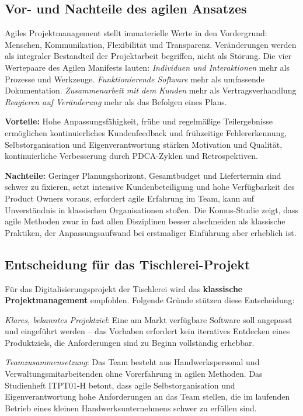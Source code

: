 \documentclass[
    a4paper,
    11pt,
    bibliography=totoc,
    listof=totoc,
    parskip=half,
    headings=normal
]{scrbook}
\begin{document}
\subsection{Vor- und Nachteile des agilen Ansatzes}

Agiles Projektmanagement stellt immaterielle Werte in den Vordergrund: Menschen,
Kommunikation, Flexibilität und Transparenz. Veränderungen werden als integraler
Bestandteil der Projektarbeit begriffen, nicht als Störung\autocite[vgl.][Kap.~1]{Reppin2020}. Die vier Wertepaare des Agilen Manifests lauten:
\textit{Individuen und Interaktionen} mehr als Prozesse und Werkzeuge.
\textit{Funktionierende Software} mehr als umfassende Dokumentation.
\textit{Zusammenarbeit mit dem Kunden} mehr als Vertragsverhandlung
\textit{Reagieren auf Veränderung} mehr als das Befolgen eines Plans\autocite[vgl.][]{BeckEtAl2001a}.

\textbf{Vorteile:} Hohe Anpassungsfähigkeit, frühe und regelmäßige Teilergebnisse
ermöglichen kontinuierliches Kundenfeedback und frühzeitige Fehlererkennung,
Selbstorganisation und Eigenverantwortung stärken Motivation und Qualität,
kontinuierliche Verbesserung durch PDCA-Zyklen und Retrospektiven\autocite[vgl.][Kap.~1]{Reppin2020}.

\textbf{Nachteile:} Geringer Planungshorizont, Gesamtbudget und Liefertermin sind
schwer zu fixieren, setzt intensive Kundenbeteiligung und hohe Verfügbarkeit
des Product Owners voraus, erfordert agile Erfahrung im Team, kann auf
Unverständnis in klassischen Organisationen stoßen\autocite[vgl.][Kap.~1]{Reppin2020}. Die Komus-Studie zeigt, dass agile Methoden
zwar in fast allen Disziplinen besser abschneiden als klassische Praktiken, der
Anpassungsaufwand bei erstmaliger Einführung aber erheblich ist\autocite[vgl.][]{Komus2015}.

\subsection{Entscheidung für das Tischlerei-Projekt}

Für das Digitalisierungsprojekt der Tischlerei wird das \textbf{klassische
      Projektmanagement} empfohlen. Folgende Gründe stützen diese Entscheidung:

\textit{Klares, bekanntes Projektziel}: Eine am Markt verfügbare Software soll
angepasst und eingeführt werden -- das Vorhaben erfordert kein iteratives
Entdecken eines Produktziels, die Anforderungen sind zu Beginn vollständig
erhebbar.

\textit{Teamzusammensetzung}: Das Team besteht aus Handwerkspersonal und
Verwaltungsmitarbeitenden ohne Vorerfahrung in agilen Methoden. Das Studienheft
ITPT01-H betont, dass agile Selbstorganisation und Eigenverantwortung hohe
Anforderungen an das Team stellen\autocite[vgl.][Kap.~1]{Reppin2020}, die
im laufenden Betrieb eines kleinen Handwerksunternehmens schwer zu erfüllen sind.
\end{document}
